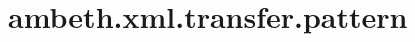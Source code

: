 \section{ambeth.xml.transfer.pattern}
\label{configuration:AmbethXmlTransferPattern}
\AvailableInJavaAndCsharp{\TODO}
